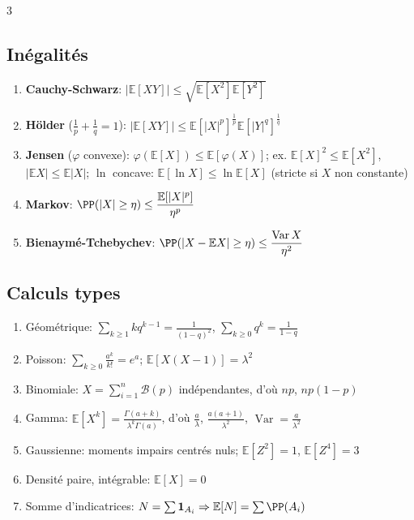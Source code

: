 \documentclass[12pt, a4paper]{article}
\newcommand{\E}{\mathbb{E}}
\newcommand{\Var}{\operatorname{Var}}
\newcommand{\ind}{\mathbf{1}}
\begin{document}
\begin{multicols*}{3}
	\colbreak
	\subsection{Inégalités}
	\begin{enumerate}[\roman*.]
		\item \textbf{Cauchy-Schwarz}: $|\E[XY]|\leq\sqrt{\E[X^2]\E[Y^2]}$
		\item \textbf{Hölder} ($\frac1p+\frac1q=1$): $|\E[XY]|\leq\E[|X|^p]^{\frac1p}\E[|Y|^q]^{\frac1q}$
		\item \textbf{Jensen} ($\varphi$ convexe): $\varphi(\E[X])\leq\E[\varphi(X)]$; ex. $\E[X]^2\leq\E[X^2]$, $|\E X|\leq\E|X|$; $\ln$ concave: $\E[\ln X]\leq\ln\E[X]$ (stricte si $X$ non constante)
		\item \textbf{Markov}: $\PP(|X|\geq\eta)\leq\dfrac{\E[|X|^p]}{\eta^p}$
		\item \textbf{Bienaymé-Tchebychev}: $\PP(|X-\E X|\geq\eta)\leq\dfrac{\Var X}{\eta^2}$
	\end{enumerate}

	\subsection{Calculs types}
	\begin{enumerate}[\roman*.]
		\item Géométrique: $\sum_{k\geq1}kq^{k-1}=\frac1{(1-q)^2}$, $\sum_{k\geq0}q^k=\frac1{1-q}$
		\item Poisson: $\sum_{k\geq0}\frac{a^k}{k!}=e^a$; $\E[X(X-1)]=\lambda^2$
		\item Binomiale: $X=\sum_{i=1}^n\mathcal B(p)$ indépendantes, d'où $np$, $np(1-p)$
		\item Gamma: $\E[X^k]=\frac{\Gamma(a+k)}{\lambda^k\Gamma(a)}$, d'où $\frac a\lambda$, $\frac{a(a+1)}{\lambda^2}$, $\Var=\frac a{\lambda^2}$
		\item Gaussienne: moments impairs centrés nuls; $\E[Z^2]=1$, $\E[Z^4]=3$
		\item Densité paire, intégrable: $\E[X]=0$
		\item Somme d'indicatrices: $N=\sum\ind_{A_i}\Rightarrow\E[N]=\sum\PP(A_i)$
	\end{enumerate}


\end{multicols*}
\end{document}
